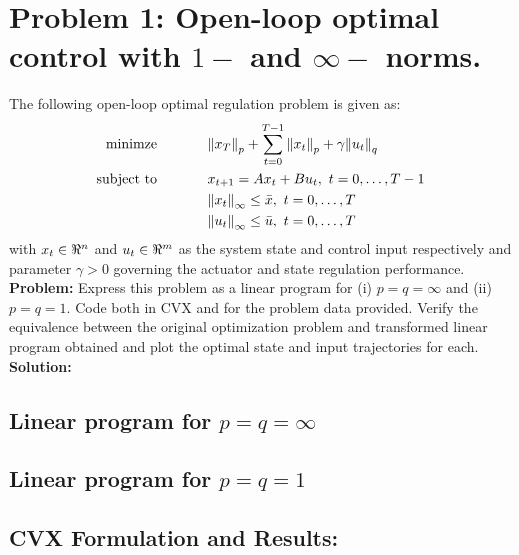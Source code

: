 \documentclass[letter]{article}
\begin{document}






\newpage
\section{Problem 1: Open-loop optimal control with $1-$ and $\infty-$ norms.}
The following open-loop optimal regulation problem is given as:
\begin{equation}\label{eq:open-loop_opt-control_def}
	\begin{aligned}
		\text{minimze} \hspace{0.5in}&\norm{x_T}_p + \sum_{t = 0}^{T-1} \norm{x_t}_p + \gamma\norm{u_t}_q\\
		\text{subject to} \hspace{0.5in} 	& x_{t+1} = A x_t + B u_t, \ t = 0,\dots,T-1\\
							& \norm{x_t}_\infty \leq \bar{x}, \ t = 0,\dots,T\\
							 & \norm{u_t}_\infty \leq \bar{u}, \ t = 0,\dots,T
	\end{aligned}
\end{equation}
with $x_t \in \real^n$ and $u_t \in \real^m$ as the system state and control input respectively and parameter $\gamma > 0$ governing the actuator and state regulation performance.\\

\textbf{Problem:}
Express this problem as a linear program for (i) $p=q=\infty$ and (ii) $p=q=1$. Code both in CVX and for the problem data provided. Verify the equivalence between the original optimization problem and transformed linear program obtained and plot the optimal state and input trajectories for each.\\

\textbf{Solution:}
\subsection{Linear program for $p = q = \infty$}





\subsection{Linear program for $p = q = 1$}





\subsection{CVX Formulation and Results:}
\end{document}
